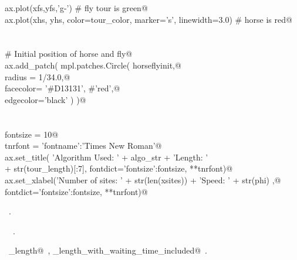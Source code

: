 \documentclass[11.5pt]{report}
\begin{document}
\begin{flushleft}
\begin{list}{}{}
\mbox{}\verb@    ax.plot(xfs,yfs,'g-') # fly tour is green@\\
\mbox{}\verb@    ax.plot(xhs, yhs, color=tour_color, marker='s', linewidth=3.0) # horse is red@\\
\mbox{}\verb@@\\
\mbox{}\verb@@\\
\mbox{}\verb@    # Initial position of horse and fly@\\
\mbox{}\verb@    ax.add_patch( mpl.patches.Circle( horseflyinit,@\\
\mbox{}\verb@                                      radius = 1/34.0,@\\
\mbox{}\verb@                                      facecolor= '#D13131', #'red',@\\
\mbox{}\verb@                                      edgecolor='black'   )  )@\\
\mbox{}\verb@@\\
\mbox{}\verb@@\\
\mbox{}\verb@    fontsize = 10@\\
\mbox{}\verb@    tnrfont = {'fontname':'Times New Roman'}@\\
\mbox{}\verb@    ax.set_title(  'Algorithm Used: ' + algo_str +  '\nTour Length: ' \@\\
\mbox{}\verb@                    + str(tour_length)[:7], fontdict={'fontsize':fontsize}, **tnrfont)@\\
\mbox{}\verb@    ax.set_xlabel('Number of sites: ' + str(len(xsites)) + '\nDrone Speed: ' + str(phi) ,@\\
\mbox{}\verb@                  fontdict={'fontsize':fontsize}, **tnrfont)@\\
\mbox{}\verb@@{\NWsep}
\end{list}
\vspace{-1.5ex}
\footnotesize
\begin{list}{}{\setlength{\itemsep}{-\parsep}\setlength{\itemindent}{-\leftmargin}}
\item \NWtxtMacroRefIn\ .
\item \NWtxtIdentsDefed\nobreak\  \verb@plotTour@\nobreak\ .\item \NWtxtIdentsUsed\nobreak\  \verb@tour_length@\nobreak\ , \verb@tour_length_with_waiting_time_included@\nobreak\ .
\item{}
\end{list}
\vspace{4ex}
\end{flushleft}
\end{document}

